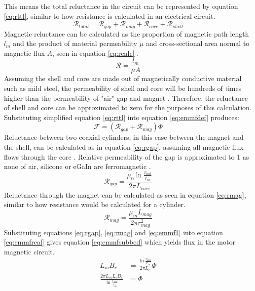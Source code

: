 \documentclass[a4paper,12pt]{article}
\begin{document}
This means the total reluctance in the circuit can be represented by equation \ref{eq:rttl}, similar to how resistance is calculated in an electrical circuit.
\begin{equation}\label{eq:rttl}
\mathcal{R}_{total}=\mathcal{R}_{gap}+\mathcal{R}_{mag}+\mathcal{R}_{core}+\mathcal{R}_{shell}
\end{equation}
Magnetic reluctance can be calculated as the proportion of magnetic path length $l_m$ and the product of material permeability $\mu$ and cross-sectional area normal to magnetic flux $A$, seen in equation \ref{eq:rcalc} \cite{coatesTransformerCoresReluctance2018}.
\begin{equation}\label{eq:rcalc}
\mathcal{R}=\frac{l_m}{\mu A}
\end{equation}
Assuming the shell and core are made out of magnetically conductive material such as mild steel, the permeability of shell and core will be hundreds of times higher than the permeability of "air" gap and magnet \cite{engineeringtoolboxPermeability2016}. Therefore, the reluctance of shell and core can be approximated to zero for the purposes of this calculation. 
Substituting simplified equation \ref{eq:rttl} into equation \ref{eq:emmfdef} produces:
\begin{equation}\label{eq:emmfreal}
\mathcal{F}=(\mathcal{R}_{gap}+\mathcal{R}_{mag})\Phi
\end{equation}
Reluctance between two coaxial cylinders, in this case between the magnet and the shell, can be calculated as in equation \ref{eq:rgap}, assuming all magnetic flux flows through the core \cite{changChapterElectrodynamics2006}. Relative permeability of the gap is approximated to 1 as none of air, silicone or eGaIn are ferromagnetic \cite{engineeringtoolboxPermeability2016}.
\begin{equation}\label{eq:rgap}
\mathcal{R}_{gap}=\frac{\mu_0 \ln{\frac{r_{out}}{r_{in}}}}{2\pi L_{core}}
\end{equation}
Reluctance through the magnet can be calculated as seen in equation \ref{eq:rmag}, similar to how resistance would be calculated for a cylinder.
\begin{equation}\label{eq:rmag}
\mathcal{R}_{mag}=\frac{\mu_m L_{mag}}{2\pi r_{mag}^2}
\end{equation}
Substituting equations \ref{eq:rgap}, \ref{eq:rmag} and \ref{eq:emmf1} into equation \ref{eq:emmfreal} gives equation \ref{eq:emmfsubbed} which yields flux in the motor magnetic circuit.
\begin{equation}\label{eq:emmfsubbed}
\begin{split}
L_m B_r & = \frac{\ln{\frac{r_{out}}{r_{in}}}}{2\pi L_c}\Phi\\
\frac{2\pi L_m L_c B_r}{\ln{\frac{r_{out}}{r_{in}}}} & = \Phi\\
\end{split}
\end{equation}
\end{document}
